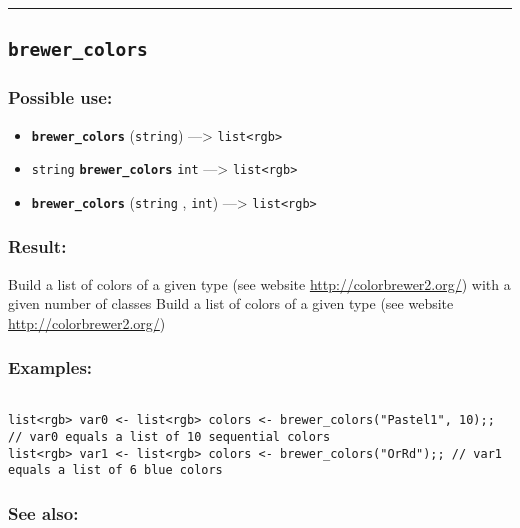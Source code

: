 \documentclass[]{book}
\providecommand{\tightlist}{%
  \setlength{\itemsep}{0pt}\setlength{\parskip}{0pt}}
\theoremstyle{definition}
\theoremstyle{definition}
\theoremstyle{definition}
\theoremstyle{remark}
\begin{document}
\begin{center}\rule{0.5\linewidth}{\linethickness}\end{center}

\subsection{\texorpdfstring{\texttt{brewer\_colors}}{brewer\_colors}}\label{brewer_colors}

\subsubsection{Possible use:}\label{possible-use-77}

\begin{itemize}
\tightlist
\item
  \textbf{\texttt{brewer\_colors}} (\texttt{string}) ---\textgreater{}
  \texttt{list\textless{}rgb\textgreater{}}
\item
  \texttt{string} \textbf{\texttt{brewer\_colors}} \texttt{int}
  ---\textgreater{} \texttt{list\textless{}rgb\textgreater{}}
\item
  \textbf{\texttt{brewer\_colors}} (\texttt{string} , \texttt{int})
  ---\textgreater{} \texttt{list\textless{}rgb\textgreater{}}
\end{itemize}

\subsubsection{Result:}\label{result-76}

Build a list of colors of a given type (see website
\url{http://colorbrewer2.org/}) with a given number of classes Build a
list of colors of a given type (see website
\url{http://colorbrewer2.org/})

\subsubsection{Examples:}\label{examples-59}

\begin{verbatim}
 
list<rgb> var0 <- list<rgb> colors <- brewer_colors("Pastel1", 10);; // var0 equals a list of 10 sequential colors 
list<rgb> var1 <- list<rgb> colors <- brewer_colors("OrRd");; // var1 equals a list of 6 blue colors
\end{verbatim}

\subsubsection{See also:}\label{see-also-48}
\end{document}
